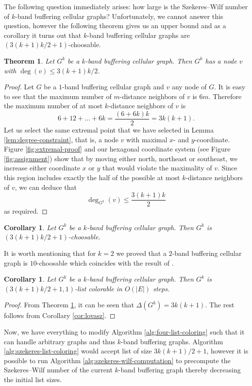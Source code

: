 \documentclass[a4paper, 12pt]{article}
\newtheorem{theo}[lem]{Theorem}
\newtheorem{corollary}[lem]{Corollary}
\begin{document}
The following question immediately arises: how large is the Szekeres\---Wilf number of $k$-band buffering cellular graphs? Unfortunately, we cannot answer this question, however the following theorem gives us an upper bound and as a corollary it turns out that $k$-band buffering cellular graphs are $(3(k+1)k/2+1)$-choosable.

\begin{theo}\label{theo:extremal-degree} Let $G^k$ be a $k$-band buffering cellular graph. Then $G^k$ has a node $v$ with $\deg(v) \leqslant 3(k+1)k/2$.
\end{theo}
\begin{proof} Let $G$ be a $1$-band buffering cellular graph and $v$ any node of $G$. It is easy to see that the maximum number of $m$-distance neighbors of $v$ is $6m$. Therefore the maximum number of at most $k$-distance neighbors of $v$ is 
$$6+12+\ldots+6k=\frac{(6 + 6k)k}{2} = 3k(k+1).$$
Let us select the same extremal point that we have selected in Lemma \ref{lem:degree-constraint}, that is, a node $v$ with maximal $x$- and $y$-coordinate. Figure \ref{fig:extremal-proof} and our hexagonal coordinate system (see Figure \ref{fig:assignment}) show that by moving either north, northeast or southeast, we increase either coordinate $x$ or $y$ that would violate the maximality of $v$. Since this region includes exactly the half of the possible at most $k$-distance neighbors of $v$, we can deduce that
$$\deg_{G^k}(v) \leqslant \frac{3(k+1)k}{2}$$ 
as required.
\end{proof}
\begin{corollary}\label{cor:main-result} Let $G^k$ be a $k$-band buffering cellular graph. Then $G^k$ is $(3(k+1)k/2+1)$-choosable.
\end{corollary}
It is worth mentioning that for $k=2$ we proved that a $2$-band buffering cellular graph is $10$-choosable which coincides with the result of \cite{7248845}. 

\begin{corollary}\label{cor:defective-main-result} Let $G^k$ be a $k$-band buffering cellular graph. Then $G^k$ is $(3(k+1)k/2+1, 1)$-list colorable in $O(|E|)$ steps.
\end{corollary}
\begin{proof} From Theorem \ref{theo:extremal-degree}, it can be seen that $\Delta(G^k) = 3k(k+1)$. The rest follows from Corollary \ref{cor:lovasz}.
\end{proof}
Now, we have everything to modify Algorithm \ref{alg:four-list-coloring} such that it can handle arbitrary graphs and thus $k$-band buffering graphs. Algorithm \ref{alg:szekeres-list-coloring} would accept list of size $3k(k+1)/2+1$, however it is possible to run Algorithm \ref{alg:szekeres-wilf-computation} to precompute the Szekeres\---Wilf number of the current $k$-band buffering graph thereby decreasing the initial list sizes.
\end{document}
